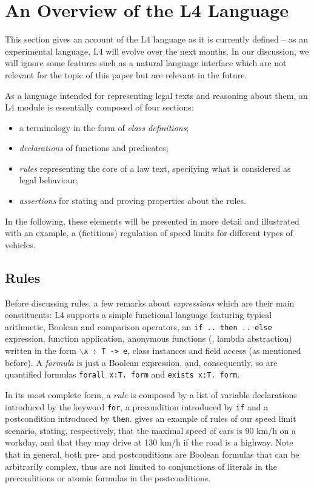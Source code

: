 \section{An Overview of the L4 Language}\label{sec:l4_language}

This section gives an account of the L4 language as it is currently defined --
as an experimental language, L4 will evolve over the next months. In our
discussion, we will ignore some features such as a natural language interface
\cite{listemnmaa2021cnl} which are not relevant for the topic of this paper but are relevant in the future.

As a language intended for representing legal texts and reasoning about them,
an L4 module is essentially composed of four sections:
\begin{itemize}
\item a terminology in the form of \emph{class definitions};
\item \emph{declarations} of functions and predicates;
\item \emph{rules} representing the core of a law text, specifying what is
  considered as legal behaviour;
\item \emph{assertions} for stating and proving properties about the rules.
\end{itemize}

In the following, these elements will be presented in more detail and
illustrated with an example, a (fictitious) regulation of speed
limits for different types of vehicles.


\subsection{Rules}\label{sec:rules}

Before discussing rules, a few remarks about \emph{expressions} which are
their main constituents: L4 supports a simple functional language featuring
typical arithmetic, Boolean and comparison operators, an \texttt{if .. then
  .. else} expression, function application, anonymous functions (\ie, lambda
abstraction) written in the form \texttt{$\backslash$x : T -> e}, class
instances and field access (as mentioned before). A \emph{formula} is just a
Boolean expression, and, consequently, so are quantified formulas
\texttt{forall x:T. form} and \texttt{exists x:T. form}.

In its most complete form, a \emph{rule} is composed by a list of variable
declarations introduced by the keyword \texttt{for}, a precondition introduced
by \texttt{if} and a postcondition introduced by
\texttt{then}.  gives an example of rules of our speed limit
scenario, stating, respectively, that the maximal speed of cars is 90 km/h on a
workday,
and that they may drive at 130 km/h if the road is a highway.  Note that in
general, both pre- and postconditions are Boolean formulas that can be
arbitrarily complex, thus are not limited to conjunctions of literals in the
preconditions or atomic formulas in the postconditions.

